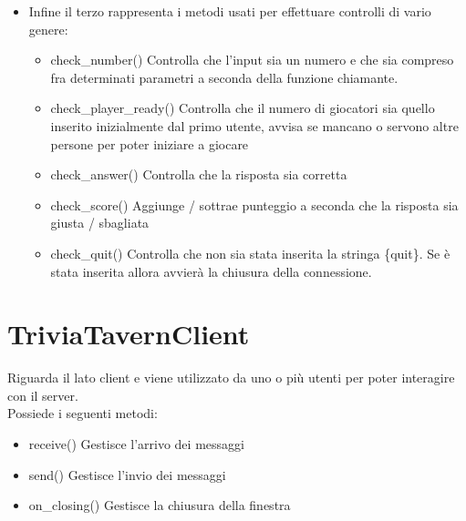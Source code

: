 \documentclass[a4paper,12pt]{report}
\begin{document}
\begin{itemize}
        \item Infine il terzo rappresenta i metodi usati per effettuare controlli di vario genere:
            \begin{itemize}
                \item check\_number() Controlla che l'input sia un numero e che sia compreso fra determinati parametri a seconda della funzione chiamante.
                \item check\_player\_ready() Controlla che il numero di giocatori sia quello inserito inizialmente dal primo utente, avvisa se mancano o servono altre persone per poter iniziare a giocare
                \item check\_answer() Controlla che la risposta sia corretta
                \item check\_score() Aggiunge / sottrae punteggio a seconda che la risposta sia giusta / sbagliata
                \item check\_quit() Controlla che non sia stata inserita la stringa \{quit\}. Se è stata inserita allora avvierà la chiusura della connessione.
            \end{itemize}
            
        \end{itemize}
    \section{TriviaTavernClient} 
        Riguarda il lato client e viene utilizzato da uno o più utenti per poter interagire con il server. \\
        Possiede i seguenti metodi: \\
        \begin{itemize}
            \item receive() Gestisce l'arrivo dei messaggi
            \item send() Gestisce l'invio dei messaggi
            \item on\_closing() Gestisce la chiusura della finestra
        \end{itemize}
        
\end{document}
